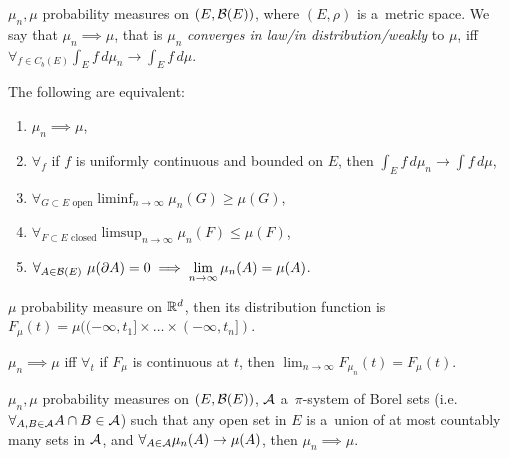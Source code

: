 



	\begin{definition}
		$\mu_n, \mu$ probability measures on $(E, \mathcal{B}(E))$, where $(E, \rho)$ is a~metric space. We say that $\mu_n \implies \mu$, that is $\mu_n$ \emph{converges in law/in distribution/weakly} to $\mu$, iff $\displaystyle\forall_{f \in C_b(E)} \int_E f\,d\mu_n \to \int_E f\,d\mu$.
	\end{definition}
	
	\begin{theorem}
		The following are equivalent:
		\begin{enumerate}
			\item $\mu_n \implies \mu$,
			\item $\forall_f$ if $f$ is uniformly continuous and bounded on $E$, then $\displaystyle\int_E f\,d\mu_n \to \int f\,d\mu$,
			\item $\displaystyle\forall_{G \subset E\text{ open}} \liminf_{n \to \infty} \mu_n(G) \geq \mu(G)$,
			\item $\displaystyle\forall_{F \subset E\text{ closed}} \limsup_{n \to \infty} \mu_n(F) \leq \mu(F)$,
			\item $\displaystyle\forall_{A \in \B(E)}\ \mu(\partial A) = 0 \implies \lim_{n \to \infty} \mu_n(A) = \mu(A)$.
		\end{enumerate}
	\end{theorem}
	
	\begin{definition}
		$\mu$ probability measure on $\mathbb{R}^d$, then its distribution function is \\ ${F_\mu(t) = \mu( (-\infty, t_1] \times \ldots \times (-\infty, t_n] )}$.
	\end{definition}
	
	\begin{theorem}
		$\mu_n \implies \mu$ iff $\forall_t$ if $F_\mu$ is continuous at $t$, then $\displaystyle\lim_{n \to \infty} F_{\mu_n}(t) = F_\mu(t)$.
	\end{theorem}
	
	\begin{lemma}
		$\mu_n, \mu$ probability measures on $(E, \mathcal{B}(E))$, ${\mathcal{A}}$ a~$\pi$-system of Borel sets (i.e. \\ ${\forall_{A, B \in {\mathcal{A}}} A \cap B \in {\mathcal{A}}}$) such that any open set in $E$ is a~union of at most countably many sets in ${\mathcal{A}}$, and $\forall_{A \in {\mathcal{A}}} \mu_n(A) \to \mu(A)$, then $\mu_n \implies \mu$.
	\end{lemma}
	
